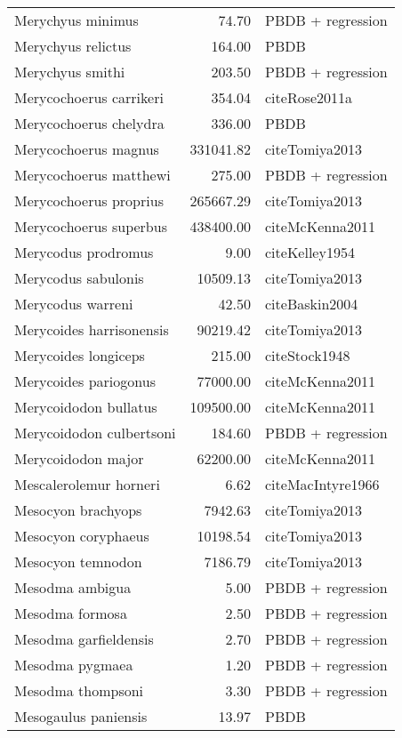 \begin{table}[ht]
\begin{tabular}{lrl}
  Merychyus minimus & 74.70 & PBDB + regression \\ 
  Merychyus relictus & 164.00 & PBDB \\ 
  Merychyus smithi & 203.50 & PBDB + regression \\ 
  Merycochoerus carrikeri & 354.04 & cite{Rose2011a} \\ 
  Merycochoerus chelydra & 336.00 & PBDB \\ 
  Merycochoerus magnus & 331041.82 & cite{Tomiya2013} \\ 
  Merycochoerus matthewi & 275.00 & PBDB + regression \\ 
  Merycochoerus proprius & 265667.29 & cite{Tomiya2013} \\ 
  Merycochoerus superbus & 438400.00 & cite{McKenna2011} \\ 
  Merycodus prodromus & 9.00 & cite{Kelley1954} \\ 
  Merycodus sabulonis & 10509.13 & cite{Tomiya2013} \\ 
  Merycodus warreni & 42.50 & cite{Baskin2004} \\ 
  Merycoides harrisonensis & 90219.42 & cite{Tomiya2013} \\ 
  Merycoides longiceps & 215.00 & cite{Stock1948} \\ 
  Merycoides pariogonus & 77000.00 & cite{McKenna2011} \\ 
  Merycoidodon bullatus & 109500.00 & cite{McKenna2011} \\ 
  Merycoidodon culbertsoni & 184.60 & PBDB + regression \\ 
  Merycoidodon major & 62200.00 & cite{McKenna2011} \\ 
  Mescalerolemur horneri & 6.62 & cite{MacIntyre1966} \\ 
  Mesocyon brachyops & 7942.63 & cite{Tomiya2013} \\ 
  Mesocyon coryphaeus & 10198.54 & cite{Tomiya2013} \\ 
  Mesocyon temnodon & 7186.79 & cite{Tomiya2013} \\ 
  Mesodma ambigua & 5.00 & PBDB + regression \\ 
  Mesodma formosa & 2.50 & PBDB + regression \\ 
  Mesodma garfieldensis & 2.70 & PBDB + regression \\ 
  Mesodma pygmaea & 1.20 & PBDB + regression \\ 
  Mesodma thompsoni & 3.30 & PBDB + regression \\ 
  Mesogaulus paniensis & 13.97 & PBDB \\ 

\end{tabular}
\end{table}
